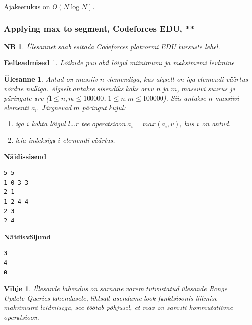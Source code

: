 \documentclass{trkut}
\newtheorem*{prereq}{Eelteadmised}
\newtheorem*{extra}{NB}
\newtheorem*{vihje}{Vihje}
\newtheorem*{Text}{Ülesanne}
\begin{document}
Ajakeerukus on $O(N\log N)$.


\subsubsection{Applying max to segment, Codeforces EDU, **}
\begin{extra}
Ülesannet saab esitada \href{https://codeforces.com/edu/course/2/lesson/5/1/practice/contest/279634/problem/B}{Codeforces platvormi EDU kursuste lehel}.
\end{extra}
\begin{prereq}
Lõikude puu abil lõigul miinimumi ja maksimumi leidmine
\end{prereq}

\begin{Text}
Antud on massiiv $n$ elemendiga, kus algselt on iga elemendi väärtus võrdne nulliga.
Algselt antakse sisendiks kaks arvu $n$ ja $m$, massiivi suurus ja päringute arv ($1\le n,m\le 100000$, $1\le n,m\le 100000$).
Siis antakse $n$ massiivi elementi $a_i$.
Järgnevad $m$ päringut kujul:
\begin{enumerate}
\item iga $i$ kohta lõigul $l...r$ tee operatsioon $a_i=max(a_i, v)$, kus $v$ on antud.
\item leia indeksiga $i$ elemendi väärtus.
\end{enumerate}

\parencite{inseg}
\end{Text}



\textbf{Näidissisend}

\begin{verbatim}
5 5
1 0 3 3
2 1
1 2 4 4
2 3
2 4
\end{verbatim}

\textbf{Näidisväljund}

\begin{verbatim}
3
4
0
\end{verbatim}


\begin{vihje}
Ülesande lahendus on sarnane varem tutvustatud ülesande Range Update Queries lahendusele, lihtsalt asendame look funktsioonis liitmise maksimumi leidmisega, see töötab põhjusel, et max on samuti kommutatiivne operatsioon.
\end{vihje}
\end{document}
